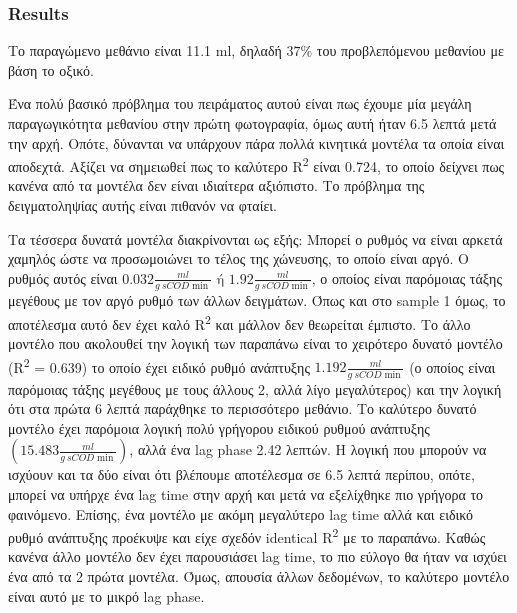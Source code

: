 \documentclass[11pt]{article}
\begin{document}
\subsubsection{Results}
\label{sec:orgc152b6b}
Το παραγώμενο μεθάνιο είναι 11.1 ml, δηλαδή \(37 \%\) του προβλεπόμενου μεθανίου με βάση το οξικό.

Ένα πολύ βασικό πρόβλημα του πειράματος αυτού είναι πως έχουμε μία μεγάλη παραγωγικότητα μεθανίου στην πρώτη φωτογραφία, όμως αυτή ήταν 6.5 λεπτά μετά την αρχή. Οπότε, δύνανται να υπάρχουν πάρα πολλά κινητικά μοντέλα τα οποία είναι αποδεχτά. Αξίζει να σημειωθεί πως το καλύτερο R\textsuperscript{2} είναι 0.724, το οποίο δείχνει πως κανένα από τα μοντέλα δεν είναι ιδιαίτερα αξιόπιστο. Το πρόβλημα της δειγματοληψίας αυτής είναι πιθανόν να φταίει.

Τα τέσσερα δυνατά μοντέλα διακρίνονται ως εξής: Μπορεί ο ρυθμός να είναι αρκετά χαμηλός ώστε να προσωμοιώνει το τέλος της χώνευσης, το οποίο είναι αργό. Ο ρυθμός αυτός είναι \(0.032 \frac{ml}{g ~ sCOD \min } \text{ ή } 1.92 \frac{ml}{g ~ sCOD \min }\), ο οποίος είναι παρόμοιας τάξης μεγέθους με τον αργό ρυθμό των άλλων δειγμάτων. Όπως και στο sample 1 όμως, το αποτέλεσμα αυτό δεν έχει καλό R\textsuperscript{2} και μάλλον δεν θεωρείται έμπιστο. Το άλλο μοντέλο που ακολουθεί την λογική των παραπάνω είναι το χειρότερο δυνατό μοντέλο (R\textsuperscript{2} = 0.639) το οποίο έχει ειδικό ρυθμό ανάπτυξης \(1.192 \frac{ml}{g ~ sCOD \min }\) (ο οποίος είναι παρόμοιας τάξης μεγέθους με τους άλλους 2, αλλά λίγο μεγαλύτερος) και την λογική ότι στα πρώτα 6 λεπτά παράχθηκε το περισσότερο μεθάνιο. Το καλύτερο δυνατό μοντέλο έχει παρόμοια λογική πολύ γρήγορου ειδικού ρυθμού ανάπτυξης \(\left( 15.483 \frac{ml}{g ~ sCOD \min } \right)\), αλλά ένα lag phase 2.42 λεπτών. Η λογική που μπορούν να ισχύουν και τα δύο είναι ότι βλέπουμε αποτέλεσμα σε 6.5 λεπτά περίπου, οπότε, μπορεί να υπήρχε ένα lag time στην αρχή και μετά να εξελίχθηκε πιο γρήγορα το φαινόμενο. Επίσης, ένα μοντέλο με ακόμη μεγαλύτερο lag time αλλά και ειδικό ρυθμό ανάπτυξης προέκυψε και είχε σχεδόν identical R\textsuperscript{2} με το παραπάνω. Καθώς κανένα άλλο μοντέλο δεν έχει παρουσιάσει lag time, το πιο εύλογο θα ήταν να ισχύει ένα από τα 2 πρώτα μοντέλα. Όμως, απουσία άλλων δεδομένων, το καλύτερο μοντέλο είναι αυτό με το μικρό lag phase.
\end{document}
